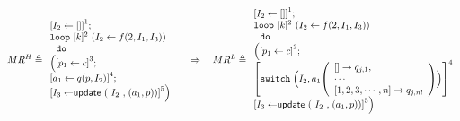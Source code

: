 \documentclass[a4paper,11pt]{article}
\begin{document}
\begin{example}
\[
MR^H \triangleq
\begin{array}{l}
    \left[I_2 \leftarrow [] \right]^1; \\
    \eloop ~ [k]^{2} ~ (I_2 \leftarrow f(2, I_1, I_3)) \\ 
    \ ~ \edo ~ \\ \Big(
    \left[p_1 \leftarrow c \right]^3 ; \\
    \left[a_1 \leftarrow q(p, I_2) \right]^4; \\
    \left[I_3 \leftarrow \eupdt( {I_2}, (a_1, p))  \right]^5
    \Big) 
\end{array}
%
~~~~ \Rightarrow ~~~
%
MR^L \triangleq
\begin{array}{l}
    \left[I_2 \leftarrow [] \right]^1; \\
    \eloop ~ [k]^{2} ~ (I_2 \leftarrow f(2,I_1, I_3)) \\ 
    \ ~ \edo ~ \\ \Big(
    \left[p_1 \leftarrow c \right]^3 ; \\
    \left[
    \eswitch \Big( I_2, a_1
    \left(\begin{array}{l}
        [ ] \to q_{j,1},\\
        \cdots\\
    \clabel{1, 2, 3, \cdots, n} \to q_{j,n!}
    \end{array}\right)
    \Big)
    \right]^4\\
    \left[I_3 \leftarrow \eupdt( {I_2}, (a_1, p))  \right]^5
    \Big) 
\end{array}
%
\]
\end{example}
\end{document}
